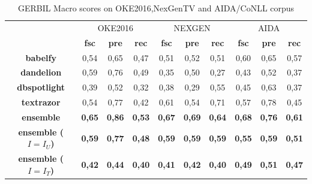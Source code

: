 \documentclass{llncs}
\begin{document}
\begin{table}
      \centering
      \setlength{\tabcolsep}{5pt}
        \begin{tabular}{c|c|c|c|c|c|c|c|c|c|}
          \multicolumn{1}{c}{ } &
          \multicolumn{3}{|c|}{OKE2016} & 
          \multicolumn{3}{|c|}{NEXGEN} &
          \multicolumn{3}{|c|}{AIDA}\\
           \multicolumn{1}{c|}{ } & \textbf{fsc} & \textbf{pre} & \textbf{rec}
           & \textbf{fsc} & \textbf{pre} & \textbf{rec} & \textbf{fsc} & \textbf{pre} & \textbf{rec} \\ \hline
            \textbf{babelfy}         & 0,54  & 0,65   & 0,47  & 0,51  & 0,52 & 0,51 & 0,60  & 0,65 & 0,57 \\ \hline
            \textbf{dandelion}       & 0,59   & 0,76   & 0,49 & 0,35  & 0,50  & 0,27 & 0,43  & 0,52 & 0,37 \\ \hline
            \textbf{dbspotlight}     & 0,39   & 0,52   & 0,32 & 0,38   & 0,29  & 0,55  & 0,45  & 0,63 & 0,37\\ \hline
            \textbf{textrazor}       & 0,54   & 0,77   & 0,42 & 0,61  & 0,54  & 0,71 & 0,57  & 0,78 & 0,45\\ \hline \hline
            \textbf{ensemble}        & \textbf{0,65}   & \textbf{0,86}   & \textbf{0,53}  & \textbf{0,67} & \textbf{0,69}  & \textbf{0,64} & \textbf{0,68}   & \textbf{0,76}   & \textbf{0,61} \\ \hline
            \textbf{ensemble ($I=I_U$)}        & \textbf{0,59}   & \textbf{0,77}   & \textbf{0,48}  & \textbf{0,59} & \textbf{0,59}  & \textbf{0,59} & \textbf{0,55}   & \textbf{0,59}   & \textbf{0,51}\\ \hline
            \textbf{ensemble ($I=I_T$)}        & \textbf{0,42} & \textbf{0,44}  & \textbf{0,40}  & \textbf{0,41} & \textbf{0,42}  & \textbf{0,40} & \textbf{0,49}   & \textbf{0,51}   & \textbf{0,47}\\ \hline
        \end{tabular}
    \caption{GERBIL Macro scores on OKE2016,NexGenTV and AIDA/CoNLL corpus}
    \label{linkscoresmacroo}
\end{table}
\end{document}
